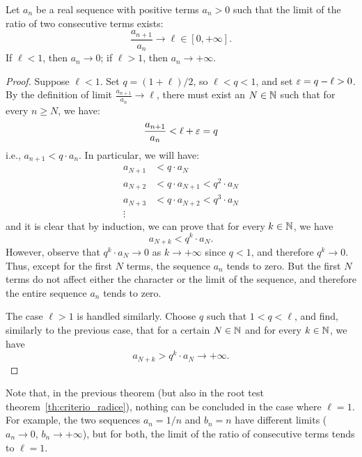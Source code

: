 \begin{theorem}
\label{th:criterio_rapporto}
  Let $a_n$ be a real sequence with positive terms
  $a_n > 0$ such that the limit of the ratio of two consecutive terms exists:
  \[
     \frac{a_{n+1}}{a_n} \to \ell \in [0,+\infty].
  \]
  If $\ell < 1$, then $a_n \to 0$; if $\ell >1$, then $a_n \to +\infty$.
\end{theorem}
%
%
%

\begin{proof}
Suppose $\ell<1$. Set $q=(1+\ell)/2$, so $\ell < q < 1$, 
and set $\varepsilon=q-\ell>0$. By the definition of limit $\frac{a_{n+1}}{a_n}\to
\ell$,
there must exist an $N\in {\mathbb N}$ such
that for every $n\ge N$, we have:
\[
  \frac{a_{n+1}}{a_n} < \ell + \varepsilon = q
\]
i.e., $a_{n+1} < q \cdot a_n$. In particular, we will have:
\begin{align*}
  a_{N+1} &< q \cdot a_N \\
  a_{N+2} &< q \cdot a_{N+1} < q^2\cdot a_N \\
  a_{N+3} &< q \cdot a_{N+2} < q^3\cdot a_N \\
  \vdots
\end{align*}
and it is clear that by induction, we can prove that for
every $k\in {\mathbb N}$, we have
\[
  a_{N+k} < q^k\cdot a_N.
\]
However, observe that $q^k \cdot a_N \to 0$ as $k\to +\infty$
since $q<1$, and therefore $q^k \to 0$. 
Thus, except for the first $N$ terms, the sequence $a_n$ tends to zero. 
But the first $N$ terms do not affect either the character or the limit 
of the sequence, and therefore the entire sequence $a_n$ tends to zero.

The case $\ell>1$ is handled similarly. Choose $q$ such
that $1<q<\ell$, and find, similarly to the previous case,
that for a certain $N\in {\mathbb N}$ and for every $k\in {\mathbb N}$, we have
\[
  a_{N+k} > q^k \cdot a_N \to +\infty.
\]
\end{proof}

Note that, in the previous theorem (but also in the root test
theorem~\ref{th:criterio_radice}),
nothing can be concluded in
the case where $\ell = 1$.
For example, the two sequences $a_n = 1/n$ and $b_n = n$
have different limits ($a_n \to 0$, $b_n\to +\infty$), but for both,
the limit of the ratio of consecutive terms tends to $\ell=1$.

